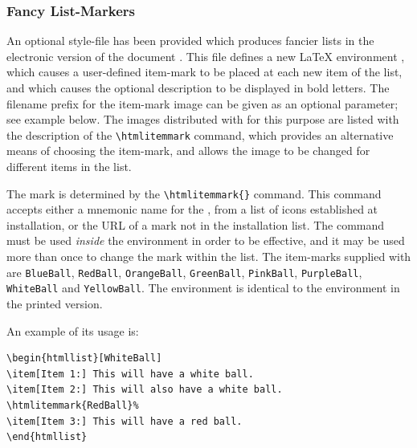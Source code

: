 \subsubsection{Fancy List-Markers\label{htmllist}}
%
%
%
An optional style-file  has been provided which
produces fancier lists in the electronic version of the document%
\html{, }.
This file defines a new \LaTeX{} environment ,
which causes a user-defined item-mark to be placed at each new
item of the list, and which causes the optional description
to be displayed in bold letters.
The filename prefix for the item-mark image can be given as an
optional parameter; see example below. The images distributed with
\latextohtml{} for this purpose are listed with the description
of the \verb|\htmlitemmark| command, which provides an alternative
means of choosing the item-mark, and allows the image to be changed
for different items in the list.

%
%
%
\html{\\}%
%
The mark is determined
by the \verb|\htmlitemmark{|\verb|}| command.  
This command accepts either a mnemonic name for the , 
from a list of icons established at installation, or the URL of a mark
not in the installation list. 
The command  must be used \emph{inside} the 
 environment in order to be effective, 
and it may be used more than once to change the mark within the list.  
The item-marks supplied with \latextohtml{} are 
\texttt{BlueBall}, \texttt{RedBall}, \texttt{OrangeBall}, \texttt{GreenBall}, 
\texttt{PinkBall}, \texttt{PurpleBall}, \texttt{WhiteBall} and \texttt{YellowBall}.
The  environment is identical to 
the  environment in the printed version.

%

\noindent 
An example of its usage is:
\begin{small}
\begin{verbatim}
\begin{htmllist}[WhiteBall]
\item[Item 1:] This will have a white ball.
\item[Item 2:] This will also have a white ball.
\htmlitemmark{RedBall}%
\item[Item 3:] This will have a red ball.
\end{htmllist}
\end{verbatim}
\end{small}

